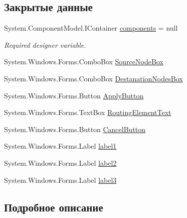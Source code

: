 \subsection*{Закрытые данные}
\begin{DoxyCompactItemize}
\item 
System.\+Component\+Model.\+I\+Container \hyperlink{class_desktop_network_analyzator_1_1_add_routing_element_a890ca22369b22d17ac5faf9ba71b98dd}{components} = null
\begin{DoxyCompactList}\small\item\em Required designer variable. \end{DoxyCompactList}\item 
System.\+Windows.\+Forms.\+Combo\+Box \hyperlink{class_desktop_network_analyzator_1_1_add_routing_element_a99e0f94879ded3763ca1efd408476f15}{Source\+Node\+Box}
\item 
System.\+Windows.\+Forms.\+Combo\+Box \hyperlink{class_desktop_network_analyzator_1_1_add_routing_element_aa266b6496dbd1b1c37d33eac098c3367}{Destanation\+Nodes\+Box}
\item 
System.\+Windows.\+Forms.\+Button \hyperlink{class_desktop_network_analyzator_1_1_add_routing_element_a881e04900de8cb8d7e0734bd6d4ce5a9}{Apply\+Button}
\item 
System.\+Windows.\+Forms.\+Text\+Box \hyperlink{class_desktop_network_analyzator_1_1_add_routing_element_addd72bdde59da31d7c11eba45b4c4c56}{Routing\+Element\+Text}
\item 
System.\+Windows.\+Forms.\+Button \hyperlink{class_desktop_network_analyzator_1_1_add_routing_element_ab4cd9dc457b2beab02d78df432a55695}{Cancel\+Button}
\item 
System.\+Windows.\+Forms.\+Label \hyperlink{class_desktop_network_analyzator_1_1_add_routing_element_aae16b705a59cfe2759cd8cda798c0f20}{label1}
\item 
System.\+Windows.\+Forms.\+Label \hyperlink{class_desktop_network_analyzator_1_1_add_routing_element_ac4aab0134a19193657cf3c881de0b987}{label2}
\item 
System.\+Windows.\+Forms.\+Label \hyperlink{class_desktop_network_analyzator_1_1_add_routing_element_a8ab52a205de9c87191fc4051b39787b3}{label3}
\end{DoxyCompactItemize}


\subsection{Подробное описание}



